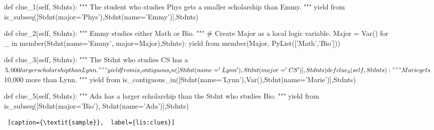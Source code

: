 \begin{figure*}[htb]
\flushright
\begin{minipage}[c]{0.95\textwidth}
\begin{python1}
def clue_1(self, Stdnts):
  """ The student who studies Phys gets a smaller scholarship than Emmy. """
  yield from is_subseq([Stdnt(major='Phys'),Stdnt(name='Emmy')],Stdnts)

def clue_2(self, Stdnts):
  """ Emmy studies either Math or Bio. """
  # Create Major as a local logic variable.
  Major = Var()
  for _ in member(Stdnt(name='Emmy', major=Major),Stdnts):
    yield from member(Major, PyList(['Math','Bio'])) 
  
def clue_3(self, Stdnts):
  """ The Stdnt who studies CS has a $5,000 larger scholarship than Lynn. """
  yield from is_contiguous_in([Stdnt(name='Lynn'), Stdnt(major='CS')], Stdnts)
  
def clue_4(self, Stdnts):
  """ Marie gets $10,000 more than Lynn. """
  yield from is_contiguous_in([Stdnt(name='Lynn'),Var(),Stdnt(name='Marie')],Stdnts)
  
def clue_5(self, Stdnts):
  """ Ada has a larger scholarship than the Stdnt who studies Bio. """
  yield from is_subseq([Stdnt(major='Bio'), Stdnt(name='Ada')],Stdnts)
\end{python1}\linv
\begin{lstlisting} [caption={\textit{sample}},  label={lis:clues}]
\end{lstlisting}
\end{minipage}\linv
\end{figure*}





